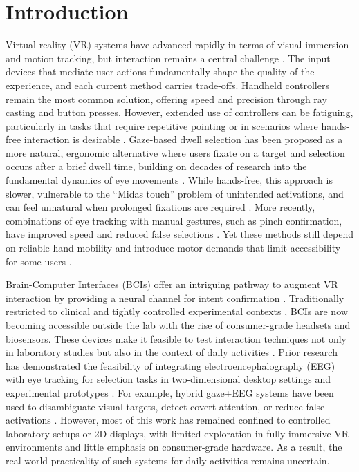 \documentclass[utf8]{FrontiersinHarvard} %
\begin{document}
\section{Introduction}
Virtual reality (VR) systems have advanced rapidly in terms of visual immersion and motion tracking, but interaction remains a central challenge \citep{1011452,laviola2017book,101063}. The input devices that mediate user actions fundamentally shape the quality of the experience, and each current method carries trade-offs. Handheld controllers remain the most common solution, offering speed and precision through ray casting and button presses. However, extended use of controllers can be fatiguing, particularly in tasks that require repetitive pointing or in scenarios where hands-free interaction is desirable \citep{9419261}. Gaze-based dwell selection has been proposed as a more natural, ergonomic alternative \citep{9873986} where users fixate on a target and selection occurs after a brief dwell time, building on decades of research into the fundamental dynamics of eye movements \citep{101167,101001}. While hands-free, this approach is slower, vulnerable to the “Midas touch” problem \citep{Tang02062025} of unintended activations, and can feel unnatural when prolonged fixations are required \citep{8699248,isomoto,Chakraborty}. More recently, combinations of eye tracking with manual gestures, such as pinch confirmation, have improved speed and reduced false selections \citep{Zhang02072020,Vertegaal,Stellmach}. Yet these methods still depend on reliable hand mobility and introduce motor demands that limit accessibility for some users \citep{Gherman}. 

Brain-Computer Interfaces (BCIs) offer an intriguing pathway to augment VR interaction by providing a neural channel for intent confirmation \citep{Saxena}. Traditionally restricted to clinical and tightly controlled experimental contexts \citep{s19061423,s120201211}, BCIs are now becoming accessible outside the lab with the rise of consumer-grade headsets and biosensors. These devices make it feasible to test interaction techniques not only in laboratory studies but also in the context of daily activities \citep{Vasiljevic20012020,Pan2017EvaluationOC,a10795393}. Prior research has demonstrated the feasibility of integrating electroencephalography (EEG) with eye tracking for selection tasks in two-dimensional desktop settings and experimental prototypes \citep{Putze,Putze2,Hild}. For example, hybrid gaze+EEG systems have been used to disambiguate visual targets, detect covert attention, or reduce false activations \citep{Shishkin,kalaganis2018erroraware,Vortmann,evain}. However, most of this work has remained confined to controlled laboratory setups or 2D displays, with limited exploration in fully immersive VR environments \citep{larsen2024synchronized} and little emphasis on consumer-grade hardware. As a result, the real-world practicality of such systems for daily activities remains uncertain.
\end{document}

